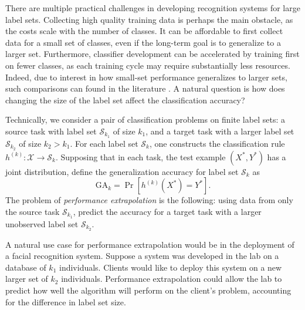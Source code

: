 \documentclass[twoside,11pt]{article}
\begin{document}
There are multiple practical challenges in developing recognition
systems for large label sets. Collecting high quality training data is
perhaps the main obstacle, as the costs scale with the number of
classes.  It can be affordable to first collect data for a small set
of classes, even if the long-term goal is to generalize to a larger
set.  Furthermore, classifier development can be accelerated by
training first on fewer classes, as each training cycle may require
substantially less resources.  Indeed, due to interest in how
small-set performance generalizes to larger sets, such comparisons can
found in the literature \citep{oquab2014learning, griffin2007caltech}.
A natural question is how does changing the size of the label set
affect the classification accuracy?

Technically, we consider a pair of classification problems on finite
label sets: a source task with label set $\mathcal{S}_{k_1}$ of size
$k_1$, and a target task with a larger label set $\mathcal{S}_{k_2}$
of size $k_2 > k_1$.  For each label set $\mathcal{S}_k$, one
constructs the classification rule $h^{(k)}:\mathcal{X} \to
\mathcal{S}_{k}$.  Supposing that in each task, the test example
$(X^*, Y^*)$ has a joint distribution, define the generalization
accuracy for label set $\mathcal{S}_k$ as
\begin{equation}\label{eq:ga_k}
\text{GA}_k = \Pr[h^{(k)}(X^*) = Y^*].
\end{equation}
The problem of \emph{performance extrapolation} is the following:
using data from only the source task $\mathcal{S}_{k_1}$, 
predict the accuracy for a target task with a larger unobserved 
label set $\mathcal{S}_{k_2}$.

A natural use case for performance extrapolation would be in the
deployment of a facial recognition system.  Suppose a system was
developed in the lab on a database of $k_1$ individuals. Clients would
like to deploy this system on a new larger set of $k_2$
individuals. Performance extrapolation could allow the lab to predict
how well the algorithm will perform on the client's problem,
accounting for the difference in label set size.
\end{document}
